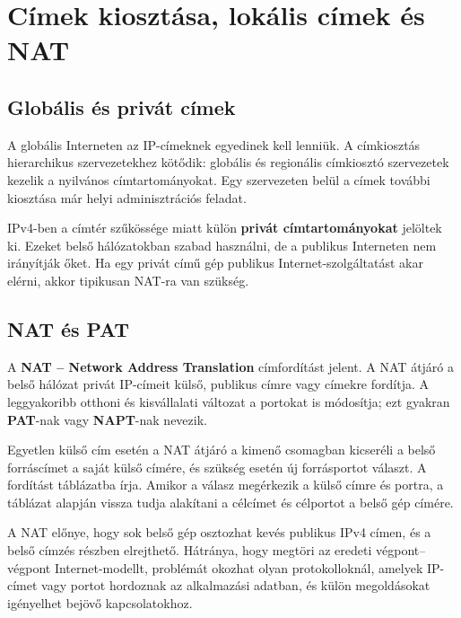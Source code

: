 \section{Címek kiosztása, lokális címek és NAT}

\subsection{Globális és privát címek}

A globális Interneten az IP-címeknek egyedinek kell lenniük. A címkiosztás hierarchikus szervezetekhez kötődik: globális és regionális címkiosztó szervezetek kezelik a nyilvános címtartományokat. Egy szervezeten belül a címek további kiosztása már helyi adminisztrációs feladat.

IPv4-ben a címtér szűkössége miatt külön \textbf{privát címtartományokat} jelöltek ki. Ezeket belső hálózatokban szabad használni, de a publikus Interneten nem irányítják őket. Ha egy privát című gép publikus Internet-szolgáltatást akar elérni, akkor tipikusan NAT-ra van szükség.

\begin{center}

\end{center}

\subsection{NAT és PAT}

A \textbf{NAT -- Network Address Translation} címfordítást jelent. A NAT átjáró a belső hálózat privát IP-címeit külső, publikus címre vagy címekre fordítja. A leggyakoribb otthoni és kisvállalati változat a portokat is módosítja; ezt gyakran \textbf{PAT}-nak vagy \textbf{NAPT}-nak nevezik.

Egyetlen külső cím esetén a NAT átjáró a kimenő csomagban kicseréli a belső forráscímet a saját külső címére, és szükség esetén új forrásportot választ. A fordítást táblázatba írja. Amikor a válasz megérkezik a külső címre és portra, a táblázat alapján vissza tudja alakítani a célcímet és célportot a belső gép címére.



A NAT előnye, hogy sok belső gép osztozhat kevés publikus IPv4 címen, és a belső címzés részben elrejthető. Hátránya, hogy megtöri az eredeti végpont--végpont Internet-modellt, problémát okozhat olyan protokolloknál, amelyek IP-címet vagy portot hordoznak az alkalmazási adatban, és külön megoldásokat igényelhet bejövő kapcsolatokhoz.

